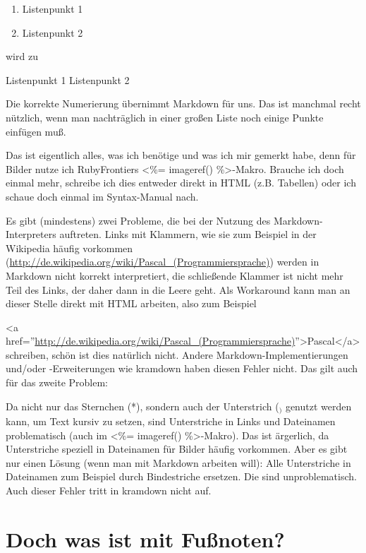 \documentclass[11pt]{report}
\begin{document}
\begin{enumerate}
\item Listenpunkt 1
\item Listenpunkt 2
\end{enumerate}

wird zu

Listenpunkt 1
Listenpunkt 2

Die korrekte Numerierung übernimmt Markdown für uns. Das ist manchmal
recht nützlich, wenn man nachträglich in einer großen Liste noch
einige Punkte einfügen muß.


Das ist eigentlich alles, was ich benötige und was ich mir gemerkt
habe, denn für Bilder nutze ich RubyFrontiers <\%= imageref()
\%>-Makro. Brauche ich doch einmal mehr, schreibe ich dies entweder
direkt in HTML (z.B. Tabellen) oder ich schaue doch einmal im
Syntax-Manual nach.


Es gibt (mindestens) zwei Probleme, die bei der Nutzung des
Markdown-Interpreters auftreten. Links mit Klammern, wie sie zum
Beispiel in der Wikipedia häufig vorkommen
(\href{http://de.wikipedia.org/wiki/Pascal_(Programmiersprache)}{http://de.wikipedia.org/wiki/Pascal\_(Programmiersprache)}) werden in
Markdown nicht korrekt interpretiert, die schließende Klammer ist
nicht mehr Teil des Links, der daher dann in die Leere geht. Als
Workaround kann man an dieser Stelle direkt mit HTML arbeiten, also
zum Beispiel


<a href=''\href{http://de.wikipedia.org/wiki/Pascal_(Programmiersprache)}{http://de.wikipedia.org/wiki/Pascal\_(Programmiersprache)}''>Pascal</a>
schreiben, schön ist dies natürlich nicht. Andere
Markdown-Implementierungen und/oder -Erweiterungen wie kramdown haben
diesen Fehler nicht. Das gilt auch für das zweite Problem:


Da nicht nur das Sternchen (*), sondern auch der Unterstrich ($_)$
genutzt werden kann, um Text kursiv zu setzen, sind Unterstriche in
Links und Dateinamen problematisch (auch im <\%= imageref()
\%>-Makro). Das ist ärgerlich, da Unterstriche speziell in Dateinamen
für Bilder häufig vorkommen. Aber es gibt nur einen Lösung (wenn man
mit Markdown arbeiten will): Alle Unterstriche in Dateinamen zum
Beispiel durch Bindestriche ersetzen. Die sind unproblematisch. Auch
dieser Fehler tritt in kramdown nicht auf.
\section{Doch was ist mit Fußnoten?}
\label{sec-2-7-1}
\end{document}
